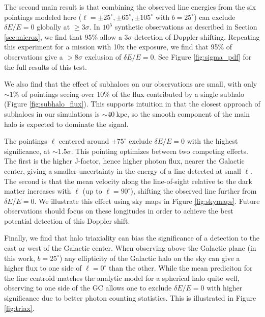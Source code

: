 \documentclass[aps,prd,10pt,twocolumn,superscriptaddress,showpacs,footinbib]{revtex4-1}
\newcommand{\units}[1]{~\mathrm{#1}}
\begin{document}
The second main result is that combining the observed line energies from the six pointings modeled
here ($\ell=\pm25^\circ,\pm65^\circ,\pm105^\circ$ with $b=25^\circ$) can exclude
$\delta E/E = 0$ globally at $\geq 3\sigma$. In $10^5$ synthetic observations as described in
Section \ref{sec:microx}, we find that 95\% allow a $3\sigma$ detection of Doppler shifting. Repeating this
experiment for a mission with 10x the exposure, we find that 95\% of observations give a $>8\sigma$
exclusion of $\delta E/E = 0$. See Figure \ref{fig:sigma_pdf} for the full results of this test.

We also find that the effect of subhaloes on our observations are small,
with only $\sim1\%$ of pointings seeing over 10\% of the flux contributed by a single subhalo
(Figure \ref{fig:subhalo_flux}). This supports intuition in that the closest approach of subhaloes in our
simulations is $\sim40\units{kpc}$, so the smooth component of the main halo is expected to dominate
the signal.

The pointings $\ell$ centered around $\pm75^\circ$ exclude $\delta E/E=0$ with 
the highest significance, at $\sim 1.5\sigma$.  This pointing optimizes between two
competing effects. The first is the higher J-factor, hence higher
photon flux, nearer the Galactic center, giving a smaller uncertainty in the energy of a line
detected at small $\ell$. The second is that the mean velocity along the line-of-sight relative to
the dark matter increases with $\ell$ (up to $\ell=90^\circ$), shifting the observed line further
from $\delta E/E=0$. We illustrate this effect using sky maps in Figure \ref{fig:skymaps}.
Future observations should focus on these longitudes
in order to achieve the best potential detection of this Doppler shift.

Finally, we find that halo triaxiality can bias the significance of a detection to
the east or west of the Galactic center. When observing above the Galactic plane (in this work,
$b=25^\circ$) any ellipticity of the Galactic halo on the sky can give a higher flux to one side of
$\ell=0^\circ$ than the other. While the mean prediciton for the line centroid matches the analytic model
for a spherical halo quite well, observing to one side of the GC allows one to exclude $\delta
E/E=0$ with higher significance due to better photon counting statistics. This is illustrated in
Figure \ref{fig:triax}. 
\end{document}
